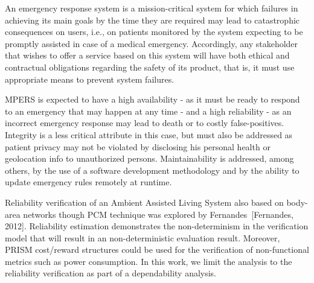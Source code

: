 An emergency response system is a mission-critical system for which failures in achieving its main goals by the time they are required may lead to catastrophic consequences on users, i.e., on patients monitored by the system expecting to be promptly assisted in case of a medical emergency. Accordingly, any stakeholder that wishes to offer a service based on this system will have both ethical and contractual obligations regarding the safety of its product, that is, it must use appropriate means to prevent system failures.

MPERS is expected to have a high availability - as it must be ready to respond to an emergency that may happen at any time - and a high reliability - as an incorrect emergency response may lead to death or to costly false-positives. Integrity is a less critical attribute in this case, but must also be addressed as patient privacy may not be violated by disclosing his personal health or geolocation info to unauthorized persons. Maintainability is addressed, among others, by the use of a software development methodology and by the ability to update emergency rules remotely at runtime.


Reliability verification of an Ambient Assisted Living System also based on body-area networks though PCM technique was explored by Fernandes~[Fernandes, 2012]. Reliability estimation demonstrates the non-determinism in the verification model that will result in an non-deterministic evaluation result. Moreover, PRISM cost/reward structures could be used for the verification of non-functional metrics such as power consumption. In this work, we limit the analysis to the reliability verification as part of a dependability analysis.


